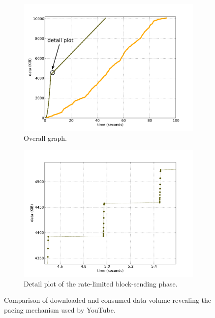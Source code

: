\begin{figure}[htbp]
    \centering
        \begin{subfigure}[b]{0.90\textwidth}
                \centering
                \includegraphics[width=\textwidth]{images/blocktransfer-mod.pdf}
                \caption{Overall graph.}
                \label{c3:fig:blocktransfer-overall}
        \end{subfigure}

        \begin{subfigure}[b]{0.90\textwidth}
                \centering
                \includegraphics[width=\textwidth]{images/blocktransferdetail.pdf}
                \caption{Detail plot of the rate-limited block-sending phase.}
                \label{c3:fig:blocktransfer-detail}
        \end{subfigure}
\caption{Comparison of downloaded and consumed data volume revealing the pacing mechanism used by YouTube.}
\label{c3:fig:blocktransfer}
\end{figure}



